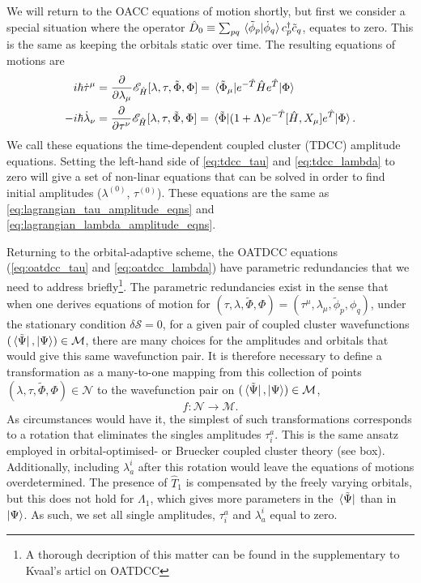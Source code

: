 We will return to the OACC equations of motion shortly, but first we consider a special 
situation where the operator
$\hat{D}_0 \equiv \sum_{pq} \braket*{\tilde{\phi}_p}{\dot{\phi}_q}c^\dagger_p\tilde{c}_q$,
equates to zero. This is the same as keeping the orbitals static over time. The 
resulting equations of motions are 
\begin{align}
    \label{eq:tdcc_tau}
    i\hbar\dot{\tau}^\mu 
        &= \frac{\partial}{\partial \lambda_\mu}\mathscr{E}_{\hat{H}}
            [\lambda, \tau, \tilde{\Phi}, \Phi]
        = \mel*{\tilde{\Phi}_\mu}
            {e^{-\hat{T}}\hat{H}e^{\hat{T}}}
        {\Phi} \\
    \label{eq:tdcc_lambda}
    -i\hbar\dot{\lambda}_\nu
        &= \frac{\partial}{\partial \tau^\nu}\mathscr{E}_{\hat{H}}
            [\lambda, \tau, \tilde{\Phi}, \Phi]
        = \mel*{\tilde{\Phi}}
            {(1 + \Lambda)e^{-\hat{T}}[\hat{H}, X_\mu]e^{\hat{T}}}
        {\Phi}.
\end{align}
We call these equations the time-dependent coupled cluster (TDCC) amplitude equations. 
Setting the left-hand side of
\autoref{eq:tdcc_tau} and \autoref{eq:tdcc_lambda} to zero will give a set of 
non-linar equations that can be solved in order to find initial amplitudes 
($\lambda^{(0)}$, $\tau^{(0)}$). These equations are the same as 
\autoref{eq:lagrangian_tau_amplitude_eqns} and \autoref{eq:lagrangian_lambda_amplitude_eqns}.

Returning to the orbital-adaptive scheme, the OATDCC equations 
(\autoref{eq:oatdcc_tau} and \autoref{eq:oatdcc_lambda}) have parametric redundancies
that we need to address briefly\footnote{A thorough decription of this matter can be 
found in the supplementary to Kvaal's articl on OATDCC\cite{kvaal2012ab}}. The 
parametric redundancies exist in the sense that when one derives equations of motion
for 
$(\tau, \lambda, \tilde{\Phi}, \Phi) = (\tau^\mu, \lambda_\mu, \tilde{\phi}_p, \phi_q)$,
under the stationary condition
$\delta\mathcal{S} = 0$, for a given pair of coupled cluster wavefunctions
$(\bra*{\tilde{\Psi}}, \ket{\Psi}) \in \mathcal{M}$, there are many choices for the amplitudes and 
orbitals that would give this same wavefunction pair. It is therefore necessary 
to define a transformation as a many-to-one mapping from this collection of points
$(\lambda, \tau, \tilde{\Phi}, \Phi) \in \mathcal{N}$
to the wavefunction pair on $(\bra*{\tilde{\Psi}}, \ket{\Psi}) \in \mathcal{M}$,
\begin{equation}
   f : \mathcal{N} \to \mathcal{M}. 
\end{equation}
As circumstances would have it, the simplest of such transformations corresponds to 
a rotation that eliminates the singles amplitudes $\tau^a_i$. This is the same ansatz 
employed in orbital-optimised-  or Bruecker coupled cluster theory (see box). Additionally,
including $\lambda^i_a$ after this rotation would leave the equations of motions 
overdetermined. The presence of $\hat{T}_1$ is compensated by the freely 
varying orbitals, but this does not hold for $\Lambda_1$, which gives more 
parameters in the $\bra*{\tilde{\Psi}}$ than in $\ket{\Psi}$. As such, we set all 
single amplitudes, $\tau^a_i$ and $\lambda^i_a$ equal to zero.

